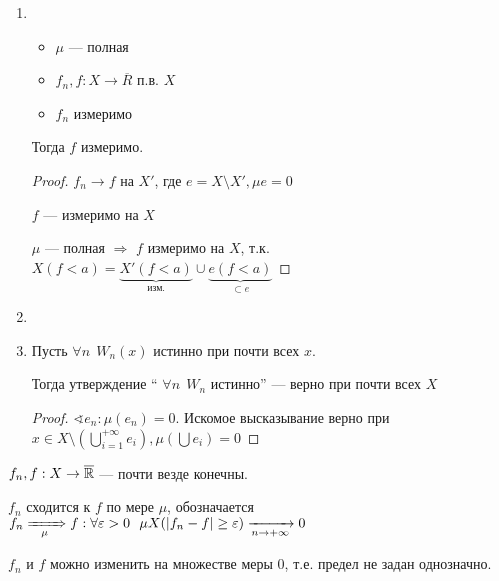 \begin{prop}\itemfix
    \begin{enumerate}
        \item \begin{itemize}
                  \item \(\mu\) --- полная
                  \item \(f_n, f : X \to \overline R\) п.в. \(X\)
                  \item \(f_n\) измеримо
              \end{itemize}

              Тогда \(f\) измеримо.

              \begin{proof}
                  \(f_n \to f\) на \(X'\), где \(e = X\setminus X', \mu e = 0\)

                  \(f\) --- измеримо на \(X\)

                  \(\mu\) --- полная \( \Rightarrow \) \(f\) измеримо на \(X\), т.к. \(X(f < a) = \underbrace{X'(f < a)}_{\text{изм.}} \cup \underbrace{e(f < a)}_{\subset e}\)
              \end{proof}

        \item \? %
        \item Пусть \(\forall n \ \ W_n(x)\) истинно при почти всех \(x\).

              Тогда утверждение `` \(\forall n \ \ W_n\) истинно'' --- верно при почти всех \(X\)

              \begin{proof}
                  \(\sphericalangle e_n : \mu(e_n) = 0\). Искомое высказывание верно при \(x\in X \setminus \left( \bigcup\limits_{i = 1}^{+\infty} e_i \right), \mu(\bigcup e_i) = 0\)
              \end{proof}
    \end{enumerate}
\end{prop}

\begin{definition}
    \(f_n, f : X \to \overline {\mathbb{R}}\) --- почти везде конечны.

    \(f_n\) сходится к \(f\) по мере \(\mu\), обозначается \(f_n \xRightarrow[\mu]{\qquad} f : \forall \varepsilon > 0 \ \ \mu X(|f_n - f| \geq \varepsilon)\xrightarrow[n\to +\infty]{} 0\)
\end{definition}

\begin{remark}
    \(f_n\) и \(f\) можно изменить на множестве меры \(0\), т.е. предел не задан однозначно.
\end{remark}

